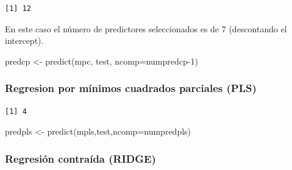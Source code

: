 \documentclass[
  letterpaper,
  DIV=11,
  numbers=noendperiod]{scrartcl}
\newenvironment{Shaded}{\begin{snugshade}}{\end{snugshade}}
\newcommand{\AttributeTok}[1]{\textcolor[rgb]{0.40,0.45,0.13}{#1}}
\newcommand{\DecValTok}[1]{\textcolor[rgb]{0.68,0.00,0.00}{#1}}
\newcommand{\FunctionTok}[1]{\textcolor[rgb]{0.28,0.35,0.67}{#1}}
\newcommand{\NormalTok}[1]{\textcolor[rgb]{0.00,0.23,0.31}{#1}}
\newcommand{\OtherTok}[1]{\textcolor[rgb]{0.00,0.23,0.31}{#1}}
\newcommand{\SpecialCharTok}[1]{\textcolor[rgb]{0.37,0.37,0.37}{#1}}
\newcommand{\StringTok}[1]{\textcolor[rgb]{0.13,0.47,0.30}{#1}}
\begin{document}
\begin{verbatim}
[1] 12
\end{verbatim}

En este caso el número de predictores seleccionados es de 7 (descontando
el intercept).

\begin{Shaded}
\begin{Highlighting}[]
\NormalTok{predcp }\OtherTok{\textless{}{-}} \FunctionTok{predict}\NormalTok{(mpc, test, }\AttributeTok{ncomp=}\NormalTok{numpredcp}\DecValTok{{-}1}\NormalTok{)}
\end{Highlighting}
\end{Shaded}

\hypertarget{regresion-por-muxednimos-cuadrados-parciales-pls}{%
\subsubsection{Regresion por mínimos cuadrados parciales
(PLS)}\label{regresion-por-muxednimos-cuadrados-parciales-pls}}

\begin{Shaded}
\end{Shaded}

\begin{verbatim}
[1] 4
\end{verbatim}

\begin{Shaded}
\begin{Highlighting}[]
\NormalTok{predpls }\OtherTok{\textless{}{-}} \FunctionTok{predict}\NormalTok{(mpls,test,}\AttributeTok{ncomp=}\NormalTok{numpredpls)}
\end{Highlighting}
\end{Shaded}

\hypertarget{regresiuxf3n-contrauxedda-ridge}{%
\subsubsection{Regresión contraída
(RIDGE)}\label{regresiuxf3n-contrauxedda-ridge}}
\end{document}
